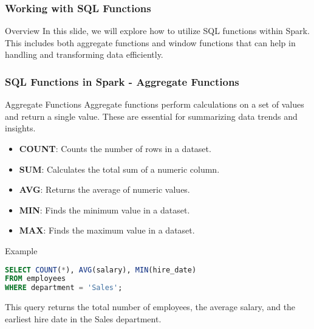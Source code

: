 \documentclass[aspectratio=169]{beamer}
\begin{document}
\begin{frame}
    \frametitle{Working with SQL Functions}
    \begin{block}{Overview}
        In this slide, we will explore how to utilize SQL functions within Spark. This includes both aggregate functions and window functions that can help in handling and transforming data efficiently.
    \end{block}
\end{frame}

\begin{frame}
    \frametitle{SQL Functions in Spark - Aggregate Functions}
    \begin{block}{Aggregate Functions}
        Aggregate functions perform calculations on a set of values and return a single value. These are essential for summarizing data trends and insights.
    \end{block}
    \begin{itemize}
        \item \textbf{COUNT}: Counts the number of rows in a dataset.
        \item \textbf{SUM}: Calculates the total sum of a numeric column.
        \item \textbf{AVG}: Returns the average of numeric values.
        \item \textbf{MIN}: Finds the minimum value in a dataset.
        \item \textbf{MAX}: Finds the maximum value in a dataset.
    \end{itemize}
    \begin{block}{Example}
        \begin{lstlisting}[language=SQL]
SELECT COUNT(*), AVG(salary), MIN(hire_date) 
FROM employees 
WHERE department = 'Sales';
        \end{lstlisting}
    \end{block}
    This query returns the total number of employees, the average salary, and the earliest hire date in the Sales department.
\end{frame}
\end{document}
